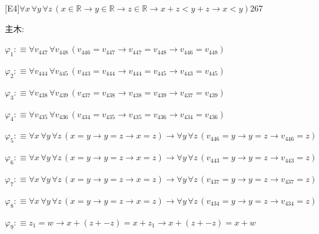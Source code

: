 \begin{fullproof}{[E4]}{$\forall x\,\forall y\,\forall z\,(x \in \mathbb{R} \to y \in \mathbb{R} \to z \in \mathbb{R} \to x + z < y + z \to x < y)$}{267}
\begin{ptree}
\noLine
{}
\end{ptree}
\noindent 主木:
\begin{ptree}
\noLine
{}
\end{ptree}
\begin{abbrevlist}
\item $\varphi_{1} :\equiv \forall v_{447}\,\forall v_{448}\,(v_{446} = v_{447} \to v_{447} = v_{448} \to v_{446} = v_{448})$
\item $\varphi_{2} :\equiv \forall v_{444}\,\forall v_{445}\,(v_{443} = v_{444} \to v_{444} = v_{445} \to v_{443} = v_{445})$
\item $\varphi_{3} :\equiv \forall v_{438}\,\forall v_{439}\,(v_{437} = v_{438} \to v_{438} = v_{439} \to v_{437} = v_{439})$
\item $\varphi_{4} :\equiv \forall v_{435}\,\forall v_{436}\,(v_{434} = v_{435} \to v_{435} = v_{436} \to v_{434} = v_{436})$
\item $\varphi_{5} :\equiv \forall x\,\forall y\,\forall z\,(x = y \to y = z \to x = z) \to \forall y\,\forall z\,(v_{446} = y \to y = z \to v_{446} = z)$
\item $\varphi_{6} :\equiv \forall x\,\forall y\,\forall z\,(x = y \to y = z \to x = z) \to \forall y\,\forall z\,(v_{443} = y \to y = z \to v_{443} = z)$
\item $\varphi_{7} :\equiv \forall x\,\forall y\,\forall z\,(x = y \to y = z \to x = z) \to \forall y\,\forall z\,(v_{437} = y \to y = z \to v_{437} = z)$
\item $\varphi_{8} :\equiv \forall x\,\forall y\,\forall z\,(x = y \to y = z \to x = z) \to \forall y\,\forall z\,(v_{434} = y \to y = z \to v_{434} = z)$
\item $\varphi_{9} :\equiv z_{1} = w \to x + (z + -z) = x + z_{1} \to x + (z + -z) = x + w$

\end{abbrevlist}
\end{fullproof}
